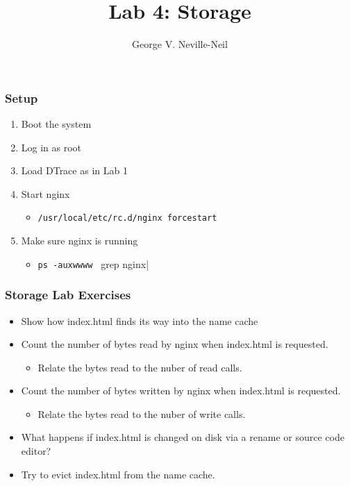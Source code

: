 \documentclass[pdftex]{beamer}
\begin{document}

\title{Lab 4: Storage}
\author[shortname]{George V. Neville-Neil}

\begin{frame}[fragile]
  \frametitle{Setup}
  \begin{enumerate}
  \item Boot the system
  \item Log in as root
  \item Load DTrace as in Lab 1
  \item Start nginx
    \begin{itemize}
    \item \verb|/usr/local/etc/rc.d/nginx forcestart|
    \end{itemize}
  \item Make sure nginx is running
    \begin{itemize}
    \item \verb|ps -auxwwww | grep nginx|
    \end{itemize}
  \end{enumerate}
\end{frame}


\begin{frame}[fragile]
  \frametitle{Storage Lab Exercises}
  \begin{itemize}
  \item Show how index.html finds its way into the name cache
  \item Count the number of bytes read by nginx when index.html is requested.
    \begin{itemize}
    \item Relate the bytes read to the nuber of read calls.
    \end{itemize}
  \item Count the number of bytes written by nginx when index.html is requested.
    \begin{itemize}
    \item Relate the bytes read to the nuber of write calls.
    \end{itemize}
  \item What happens if index.html is changed on disk via a rename or
    source code editor?
  \item Try to evict index.html from the name cache.
  \end{itemize}
\end{frame}
\end{document}
